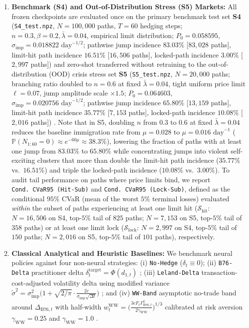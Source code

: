 \documentclass[11pt,a4paper]{article}
\begin{document}
\begin{enumerate}
  \item \textbf{Benchmark (S4) and Out-of-Distribution Stress (S5) Markets:} All frozen checkpoints are evaluated once on the primary benchmark test set \textbf{S4} (\texttt{S4\_test.npz}, $N = 100,000$ paths, $T = 60$ hedging steps; $n = 0.3, \beta = 0.2, \bar{\lambda} = 0.04$, empirical limit distribution; $P_0 = 0.058595$, $\sigma_{\text{imp}} = 0.018822\text{ day}^{-1/2}$; pathwise jump incidence $83.03\%$ [$83,028$ paths], limit-hit path incidence $16.51\%$ [$16,506$ paths], locked-path incidence $3.00\%$ [$2,997$ paths]) and zero-shot transferred without retraining to the out-of-distribution (OOD) crisis stress set \textbf{S5} (\texttt{S5\_test.npz}, $N = 20,000$ paths; branching ratio doubled to $n = 0.6$ at fixed $\bar{\lambda} = 0.04$, tight uniform price limit $\ell = 0.07$, jump amplitude scale $\times 1.5$; $P_0 = 0.064603$, $\sigma_{\text{imp}} = 0.020756\text{ day}^{-1/2}$; pathwise jump incidence $65.80\%$ [$13,159$ paths], limit-hit path incidence $35.77\%$ [$7,153$ paths], locked-path incidence $10.08\%$ [$2,016$ paths]) \citep{Geng2025,Jouini2026}. Note that in S5, doubling $n$ from $0.3$ to $0.6$ at fixed $\bar{\lambda} = 0.04$ reduces the baseline immigration rate from $\mu = 0.028$ to $\mu = 0.016\text{ day}^{-1}$ ($\mathbb{P}(N_{1:60}=0) \approx e^{-60\mu} \approx 38.3\%$), lowering the fraction of paths with at least one jump from $83.03\%$ to $65.80\%$ while concentrating jumps into violent self-exciting clusters that more than double the limit-hit path incidence ($35.77\%$ vs.\ $16.51\%$) and triple the locked-path incidence ($10.08\%$ vs.\ $3.00\%$). To audit tail performance on paths where price limits bind, we report \texttt{Cond.\ CVaR95 (Hit-Sub)} and \texttt{Cond.\ CVaR95 (Lock-Sub)}, defined as the conditional $95\%$ CVaR (mean of the worst $5\%$ terminal losses) evaluated \emph{within} the subset of paths experiencing at least one limit hit ($\mathcal{S}_{\text{hit}}$: $N = 16,506$ on S4, top-$5\%$ tail of $825$ paths; $N = 7,153$ on S5, top-$5\%$ tail of $358$ paths) or at least one limit lock ($\mathcal{S}_{\text{lock}}$: $N = 2,997$ on S4, top-$5\%$ tail of $150$ paths; $N = 2,016$ on S5, top-$5\%$ tail of $101$ paths), respectively.
  \item \textbf{Classical Analytical and Heuristic Baselines:} We benchmark neural policies against four non-neural strategies: (i) \texttt{No-Hedge} ($\delta_t \equiv 0$); (ii) \texttt{B76-Delta} practitioner delta $\delta_t^{\text{target}} = \Phi(d_{1,t})$ \citep{Black1976,BoyleEmanuel1980}; (iii) \texttt{Leland-Delta} transaction-cost-adjusted volatility delta using modified variance $\tilde{\sigma}^2 = \sigma_{\text{imp}}^2\big(1 + \sqrt{2/\pi}\cdot \frac{2c}{\sigma_{\text{imp}}\sqrt{\Delta t}}\big)$ \citep{Leland1985}; and (iv) \texttt{WW-Band} asymptotic no-trade band around $\Delta_{\text{B76},t}$ with half-width $w_t^{\text{WW}} = \big(\frac{3 c F_t \Gamma_{\text{B76},t}^2}{2\gamma_{\text{WW}}}\big)^{1/3}$ calibrated at risk aversion $\gamma_{\text{WW}} = 0.25$ and $\gamma_{\text{WW}} = 1.0$ \citep{Whalley1997}.

\end{enumerate}
\end{document}
